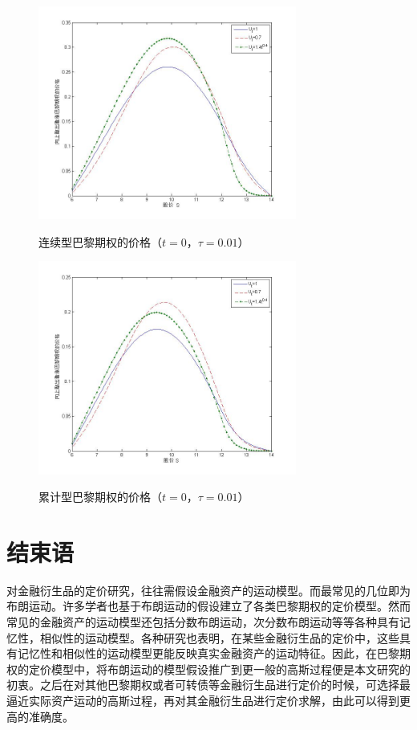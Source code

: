 \documentclass{ctexart} %
\begin{document}
\begin{figure}[H]
\begin{minipage}{0.48\linewidth}
\label{t0}
\includegraphics[width=8.5cm]{code/t0.jpg}
\caption{连续型巴黎期权的价格（$t=0$，$\tau=0.01$）}
\end{minipage}
\begin{minipage}{0.48\linewidth}
\label{t0c}
\includegraphics[width=8.5cm]{code/tc0.jpg}
\caption{累计型巴黎期权的价格（$t=0$，$\tau=0.01$）}
\end{minipage}
\end{figure}

\section{结束语}
对金融衍生品的定价研究，往往需假设金融资产的运动模型。而最常见的几位即为布朗运动。许多学者也基于布朗运动的假设建立了各类巴黎期权的定价模型。然而常见的金融资产的运动模型还包括分数布朗运动，次分数布朗运动等等各种具有记忆性，相似性的运动模型。各种研究也表明，在某些金融衍生品的定价中，这些具有记忆性和相似性的运动模型更能反映真实金融资产的运动特征。因此，在巴黎期权的定价模型中，将布朗运动的模型假设推广到更一般的高斯过程便是本文研究的初衷。之后在对其他巴黎期权或者可转债等金融衍生品进行定价的时候，可选择最逼近实际资产运动的高斯过程，再对其金融衍生品进行定价求解，由此可以得到更高的准确度。
\end{document}
